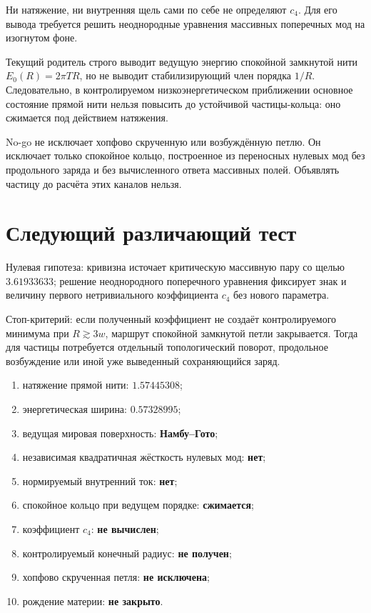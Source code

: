 Ни натяжение, ни внутренняя щель сами по себе не определяют $c_4$. Для его
вывода требуется решить неоднородные уравнения массивных поперечных мод на
изогнутом фоне.

\begin{theorem}
Текущий родитель строго выводит ведущую энергию спокойной замкнутой нити
$E_0(R)=2\pi TR$, но не выводит стабилизирующий член порядка $1/R$.
Следовательно, в контролируемом низкоэнергетическом приближении основное
состояние прямой нити нельзя повысить до устойчивой частицы-кольца: оно
сжимается под действием натяжения.
\end{theorem}

\begin{nogocriterion}
No-go не исключает хопфово скрученную или возбуждённую петлю. Он исключает
только спокойное кольцо, построенное из переносных нулевых мод без
продольного заряда и без вычисленного ответа массивных полей. Объявлять
частицу до расчёта этих каналов нельзя.
\end{nogocriterion}

\section{Следующий различающий тест}

Нулевая гипотеза: кривизна источает критическую массивную пару со щелью
$3.61933633$; решение неоднородного поперечного уравнения фиксирует знак и
величину первого нетривиального коэффициента $c_4$ без нового параметра.

Стоп-критерий: если полученный коэффициент не создаёт контролируемого
минимума при $R\gtrsim3w$, маршрут спокойной замкнутой петли закрывается.
Тогда для частицы потребуется отдельный топологический поворот, продольное
возбуждение или иной уже выведенный сохраняющийся заряд.

\begin{protocol}
\begin{enumerate}
 \item натяжение прямой нити: \textbf{$1.57445308$};
 \item энергетическая ширина: \textbf{$0.57328995$};
 \item ведущая мировая поверхность: \textbf{Намбу--Гото};
 \item независимая квадратичная жёсткость нулевых мод: \textbf{нет};
 \item нормируемый внутренний ток: \textbf{нет};
 \item спокойное кольцо при ведущем порядке: \textbf{сжимается};
 \item коэффициент $c_4$: \textbf{не вычислен};
 \item контролируемый конечный радиус: \textbf{не получен};
 \item хопфово скрученная петля: \textbf{не исключена};
 \item рождение материи: \textbf{не закрыто}.
\end{enumerate}
\end{protocol}

